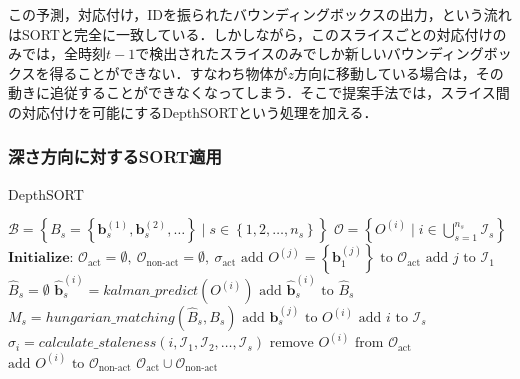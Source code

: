         この予測，対応付け，IDを振られたバウンディングボックスの出力，という流れはSORTと完全に一致している．しかしながら，このスライスごとの対応付けのみでは，全時刻$t-1$で検出されたスライスのみでしか新しいバウンディングボックスを得ることができない．すなわち物体が$z$方向に移動している場合は，その動きに追従することができなくなってしまう．そこで提案手法では，スライス間の対応付けを可能にするDepthSORTという処理を加える．

        \subsubsection{深さ方向に対するSORT適用}

        \begin{algorithm}[t]
            \caption[DepthSORT]{DepthSORT}
            \label{alg:depth_sort}
            \begin{algorithmic}[1]
                \Require $\mathcal{B} = \left\{B_s = \left\{\bm{b}_s^{(1)}, \bm{b}_s^{(2)}, \dots\right\} \mid s \in \left\{1, 2, \dots, n_s\right\}\right\}$
                \Ensure $\mathcal{O} = \left\{O^{(i)} \mid i \in \bigcup_{s=1}^{n_s} \mathcal{I}_{s}\right\}$
                \State $\textbf{Initialize: } \mathcal{O}_{\text{act}} = \emptyset,\ \mathcal{O}_{\text{non-act}} = \emptyset,\ \sigma_{\text{act}}$
                    \State $\text{add } O^{(j)} = \left\{\bm{b}_1^{(j)}\right\} \text{ to } \mathcal{O}_{\text{act}}$
                    \State $\text{add } j \text{ to }\mathcal{I}_1$
                \EndFor
                    \State $\hat{B}_s = \emptyset$
                        \State $\hat{\bm{b}}_s^{(i)} = kalman\_predict(O^{(i)})$
                        \State $\text{add } \hat{\bm{b}}_s^{(i)} \text{ to }\hat{B}_s $
                    \EndFor
                    \State $M_s = hungarian\_matching(\hat{B}_s, B_s)$
                        \State $\text{add } \bm{b}_s^{(j)} \text{ to } O^{(i)}$
                        \State $\text{add } i \text{ to } \mathcal{I}_s$
                    \EndFor
                        \State $\sigma_i = calculate\_staleness(i, \mathcal{I}_1, \mathcal{I}_2, \dots, \mathcal{I}_s)$
                            \State $\text{remove } O^{(i)} \text{ from } \mathcal{O}_{\text{act}}$
                            \State $\text{add } O^{(i)} \text{ to } \mathcal{O}_{\text{non-act}}$
                        \EndIf
                    \EndFor
                \EndFor
                \State \Return $\mathcal{O}_{\text{act}} \cup \mathcal{O}_{\text{non-act}}$
            \end{algorithmic}
        \end{algorithm}

